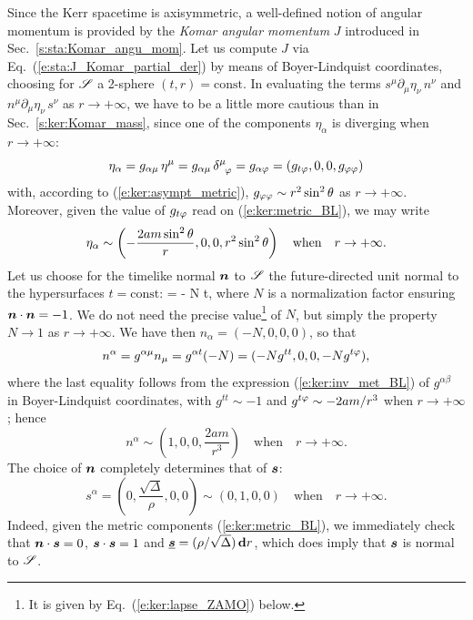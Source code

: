 Since the Kerr spacetime is axisymmetric, a well-defined notion
of angular momentum is provided by the
\emph{Komar angular momentum}
$J$ introduced in Sec.~\ref{s:sta:Komar_angu_mom}.
Let us compute $J$ via Eq.~(\ref{e:sta:J_Komar_partial_der}) by means of
Boyer-Lindquist coordinates, choosing
for $\mathscr{S}$ a 2-sphere $(t,r)=\mathrm{const}$.
In evaluating the terms $s^\mu \partial_\mu \eta_\nu \, n^\nu$
and $n^\mu \partial_\mu \eta_\nu \, s^\nu$ as $r\rightarrow+\infty$, we have
to be a little more cautious than in Sec.~\ref{s:ker:Komar_mass}, since
one of
the components $\eta_\alpha$ is diverging when $r\rightarrow+\infty$:
\[
    \eta_\alpha = g_{\alpha\mu} \, \eta^\mu = g_{\alpha\mu} \, \delta^\mu_{\ \, \varphi}
        = g_{\alpha\varphi} = (g_{t\varphi},0,0,g_{\varphi\varphi})
\]
with, according to (\ref{e:ker:asympt_metric}),
$g_{\varphi\varphi} \sim r^2\sin^2\theta$ as $r\rightarrow+\infty$.
Moreover, given the value of $g_{t\varphi}$ read on (\ref{e:ker:metric_BL}), we may
write
\[
    \eta_\alpha \sim \left( - \frac{2 a m \sin^2\theta}{r}, 0, 0, r^2\sin^2\theta \right)
        \quad\mbox{when}\quad
        r\rightarrow+\infty .
\]
Let us choose for the timelike normal $\bm{n}$ to $\mathscr{S}$
the future-directed unit normal to the hypersurfaces $t=\mathrm{const}$:
\be \label{e:ker:un_Ndt}
  = - N \dd t,
\ee
where $N$ is a normalization factor ensuring $\bm{n}\cdot\bm{n}=-1$.
We do not need the precise value\footnote{It is given by Eq.~(\ref{e:ker:lapse_ZAMO}) below.} of $N$, but simply the property $N\rightarrow 1$
as $r\rightarrow+\infty$.
We have then
$n_\alpha = (-N,0,0,0)$, so that
\[
    n^\alpha = g^{\alpha\mu} n_\mu = g^{\alpha t} (-N) =
    (- N g^{tt}, 0, 0, - N g^{t\varphi} ),
\]
where the last equality follows from the
expression (\ref{e:ker:inv_met_BL}) of $g^{\alpha\beta}$ in
Boyer-Lindquist coordinates, with $g^{tt} \sim -1$ and
$g^{t\varphi} \sim - 2 a m / r^3$ when $r\rightarrow+\infty$; hence
\[
    n^\alpha \sim \left( 1, 0, 0, \frac{2 a m}{r^3} \right)  \quad\mbox{when}\quad
        r\rightarrow+\infty .
\]
The choice of $\bm{n}$ completely determines that of $\bm{s}$:
\[
    s^\alpha = \left( 0, \frac{\sqrt{\Delta}}{\rho}, 0, 0 \right)
        \sim (0,1,0,0) \quad\mbox{when}\quad r\rightarrow+\infty .
\]
Indeed, given the metric components (\ref{e:ker:metric_BL}), we immediately
check that $\bm{n}\cdot\bm{s}=0$, $\bm{s}\cdot\bm{s}=1$ and
$\underline{\bm{s}} = (\rho/\sqrt{\Delta})\, \mathbf{d} r$, which does imply that $\bm{s}$ is normal to $\mathscr{S}$.

